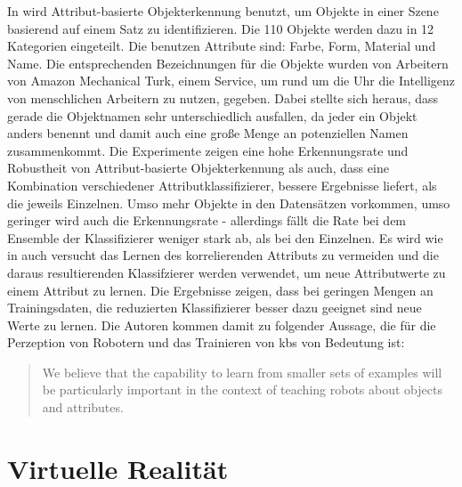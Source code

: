 In \cite{atrBasedObjIden} wird Attribut-basierte Objekterkennung benutzt, um Objekte in einer Szene basierend auf einem Satz zu identifizieren. Die 110 Objekte werden dazu in 12 Kategorien eingeteilt. Die benutzen Attribute sind: Farbe, Form, Material und Name. Die entsprechenden Bezeichnungen für die Objekte wurden von Arbeitern von Amazon Mechanical Turk, einem Service, um rund um die Uhr die Intelligenz von menschlichen Arbeitern zu nutzen, gegeben. Dabei stellte sich heraus, dass gerade die Objektnamen sehr unterschiedlich ausfallen, da jeder ein Objekt anders benennt und damit auch eine große Menge an potenziellen Namen zusammenkommt.  Die Experimente zeigen eine hohe Erkennungsrate und Robustheit von Attribut-basierte Objekterkennung als auch, dass eine Kombination verschiedener Attributklassifizierer, bessere Ergebnisse liefert, als die jeweils Einzelnen. Umso mehr Objekte in den Datensätzen vorkommen, umso geringer wird auch die Erkennungsrate - allerdings fällt die Rate bei dem Ensemble der Klassifizierer weniger stark ab, als bei den Einzelnen. Es wird wie in \cite{descObjbyAtr} auch versucht das Lernen des korrelierenden Attributs zu vermeiden und die daraus resultierenden Klassifzierer werden verwendet, um neue Attributwerte zu einem Attribut zu lernen.  Die Ergebnisse zeigen, dass bei geringen Mengen an Trainingsdaten, die reduzierten Klassifizierer besser dazu geeignet sind neue Werte zu lernen. Die Autoren kommen damit zu folgender Aussage, die für die Perzeption von Robotern und das Trainieren von \glspl{kb} von Bedeutung ist: 
\begin{quote}
\glqq We believe that the capability to learn from smaller sets
of examples will be particularly important in the context of
teaching robots about objects and attributes.\grqq
\end{quote} \par

\section{Virtuelle Realität}

